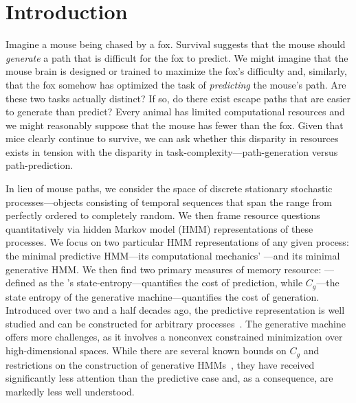 \documentclass[final,nofootinbib,aps,pre,twocolumn,showpacs,groupaddress,preprintnumbers,floatfix]{revtex4-1}
\newcommand{\Cg}{\ensuremath{C_g}\xspace}
\begin{document}


\title{\ourTitle}
\date{\today}
\maketitle



\section{Introduction}
\label{sec:introduction}

Imagine a mouse being chased by a fox. Survival suggests that the mouse should
\emph{generate} a path that is difficult for the fox to predict. We might
imagine that the mouse brain is designed or trained to maximize the fox's
difficulty and, similarly, that the fox somehow has optimized the task of
\emph{predicting} the mouse's path. Are these two tasks actually distinct?  If
so, do there exist escape paths that are easier to generate than predict?
Every animal has limited computational resources and we might reasonably
suppose that the mouse has fewer than the fox. Given that mice clearly continue
to survive, we can ask whether this disparity in resources exists in tension
with the disparity in task-complexity---path-generation versus path-prediction.

In lieu of mouse paths, we consider the space of discrete stationary stochastic
processes---objects consisting of temporal sequences that span the range from
perfectly ordered to completely random. We then frame resource questions
quantitatively via hidden Markov model (HMM) representations of these
processes. We focus on two particular HMM representations of any given process:
the minimal predictive HMM---its computational mechanics' \eM
\cite{Crut12a}---and its minimal generative HMM. We then find two primary
measures of memory resource: \Cmu---defined as the \eM's
state-entropy---quantifies the cost of prediction, while \Cg---the state
entropy of the generative machine---quantifies the cost of generation.
Introduced over two and a half decades ago, the \eM predictive representation
is well studied and can be constructed for arbitrary processes~\cite{Shal98a}.
The generative machine offers more challenges, as it involves a nonconvex
constrained minimization over high-dimensional spaces. While there are several
known bounds on \Cg and restrictions on the construction of generative
HMMs~\cite{Lohr12, Lohr09b, Lohr09c, Hell65}, they have received significantly
less attention than the predictive case and, as a consequence, are markedly
less well understood.
\end{document}
